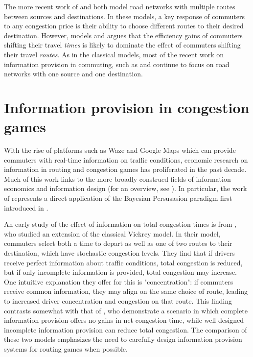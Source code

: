 \documentclass[JEL]{AEA}
\begin{document}
The more recent work of \cite{das-2017} and \cite{ostrovsky-2018} both model road networks with multiple routes between sources and destinations. In these models, a key response of commuters to any congestion price is their ability to choose different routes to their desired destination. However, \cite{arnott-1990} models and argues that the efficiency gains of commuters shifting their travel \emph{times} is likely to dominate the effect of commuters shifting their travel \emph{routes}. As in the classical models, most of the recent work on information provision in commuting, such as \cite{das-2017} and \cite{acemoglu-2016} continue to focus on road networks with one source and one destination.

\section{Information provision in congestion games}
\label{information-provision}

With the rise of platforms such as Waze and Google Maps which can provide commuters with real-time information on traffic conditions, economic research on information in routing and congestion games has proliferated in the past decade. Much of this work links to the more broadly construed fields of information economics and information design (for an overview, see \cite{bergemann-2019}). In particular, the work of \cite{das-2017} represents a direct application of the Bayesian Persusasion paradigm first introduced in \cite{kamenica-2011}.

An early study of the effect of information on total congestion times is from \cite{arnott-1991}, who studied an extension of the classical Vickrey model. In their model, commuters select both a time to depart as well as one of two routes to their destination, which have stochastic congestion levels. They find that if drivers receive perfect information about traffic conditions, total congestion is reduced, but if only incomplete information is provided, total congestion may increase. One intuitive explanation they offer for this is "concentration": if commuters receive common information, they may align on the same choice of route, leading to increased driver concentration and congestion on that route. This finding contrasts somewhat with that of \cite{das-2017}, who demonstrate a scenario in which complete information provision offers no gains in net congestion time, while well-designed incomplete information provision can reduce total congestion. The comparison of these two models emphasizes the need to carefully design information provision systems for routing games when possible.
\end{document}
